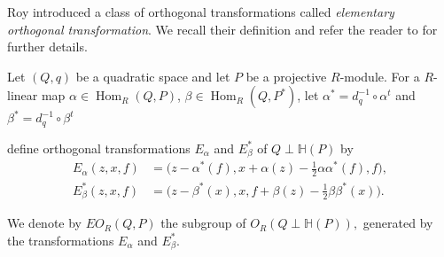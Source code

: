 \documentclass[11pt,a4paper]{amsart}
\theoremstyle{plain}
\theoremstyle{definition}
\theoremstyle{remark}
\begin{document}
 Roy introduced a class of orthogonal transformations called \emph{elementary orthogonal transformation}. We recall their definition and refer the reader to \cite{roy1968cancellation} for further details.

Let $(Q,q)$ be a quadratic space and let $P$ be a projective $R$-module. For a $R$-linear map
$\alpha\in \operatorname{Hom}_R(Q,P)$, $\beta\in \operatorname{Hom}_R(Q,P^*) $, let $\alpha^*=d_q^{-1}\circ \alpha^t$ and $\beta^*=d_q^{-1}\circ \beta^t$

define orthogonal transformations $E_\alpha$ and $E_\beta^*$ of $Q\perp \mathbb H(P)$ by
\[
\begin{aligned}
E_\alpha(z,x,f)
&=
\bigl(z-\alpha^*(f),
x+\alpha(z)-\tfrac12\alpha\alpha^*(f),
f\bigr),\\
E_\beta^*(z,x,f)
&=
\bigl(z-\beta^*(x),
x,
f+\beta(z)-\tfrac12\beta\beta^*(x)\bigr).
\end{aligned}
\]

We denote by $EO_R(Q,P)$ the subgroup of $O_R(Q\perp \mathbb H(P)),$
generated by the transformations $E_\alpha$ and $E_\beta^*$.
\end{document}

